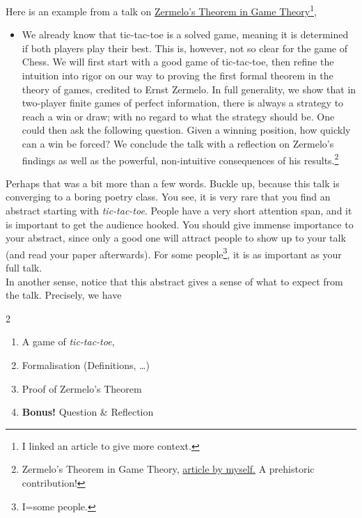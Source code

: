 \documentclass[12pt]{article}
\begin{document}
\noindent
Here is an example from a talk on \href{https://en.wikipedia.org/wiki/Zermelo%27s\_theorem\_(game_theory)}{Zermelo's Theorem in Game Theory}\footnote{I linked an article to give more context.},
    \begin{example}
        \begin{center}
        \begin{itemize}
            \item[] We already know that tic-tac-toe is a solved game, meaning it is determined if both players play their best. This is, however, not so clear for the game of Chess. We will first start with a good game of tic-tac-toe, then refine the intuition into rigor on our way to proving the first formal theorem in the theory of games, credited to Ernst Zermelo. In full generality, we show that in two-player finite games of perfect information, there is always a strategy to reach a win or draw; with no regard to what the strategy should be. One could then ask the following question. Given a winning position, how quickly can a win be forced? We conclude the talk with a reflection on Zermelo's findings as well as the powerful, non-intuitive consequences of his results.\footnote{Zermelo's Theorem in Game Theory, \href{https://elshenawyom.github.io/assets/pdf/zermelo\_paper.pdf}{article by myself.} A prehistoric \UgS contribution!}
        \end{itemize}
        \end{center}
        Perhaps that was a bit more than a few words. Buckle up, because this talk is converging to a boring poetry class. You see, it is very rare that you find an abstract starting with \emph{tic-tac-toe}. People have a very short attention span, and it is important to get the audience hooked. You should give immense importance to your abstract, since only a good one will attract people to show up to your talk (and read your paper afterwards). For some people\footnote{I=some people.}, it is as important as your full talk.\\[6pt]
        In another sense, notice that this abstract gives a sense of what to expect from the talk. Precisely, we have
        \begin{multicols}{2}
        \begin{enumerate}
            \item A game of \emph{tic-tac-toe},
            \item Formalisation (Definitions, \dots)
            \item Proof of Zermelo's Theorem
            \item \textbf{Bonus!} Question \& Reflection
        \end{enumerate}


\end{multicols}
\end{example}
\end{document}
